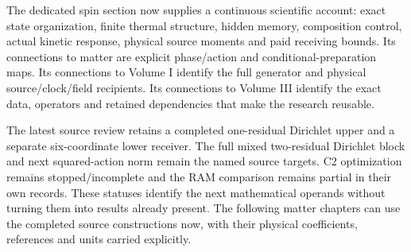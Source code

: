 The dedicated spin section now supplies a continuous scientific account: exact state organization, finite thermal structure, hidden memory, composition control, actual kinetic response, physical source moments and paid receiving bounds. Its connections to matter are explicit phase/action and conditional-preparation maps. Its connections to Volume I identify the full generator and physical source/clock/field recipients. Its connections to Volume III identify the exact data, operators and retained dependencies that make the research reusable.

The latest source review retains a completed one-residual Dirichlet upper and a separate six-coordinate lower receiver. The full mixed two-residual Dirichlet block and next squared-action norm remain the named source targets. C2 optimization remains stopped/incomplete and the RAM comparison remains partial in their own records. These statuses identify the next mathematical operands without turning them into results already present. The following matter chapters can use the completed source constructions now, with their physical coefficients, references and units carried explicitly.
